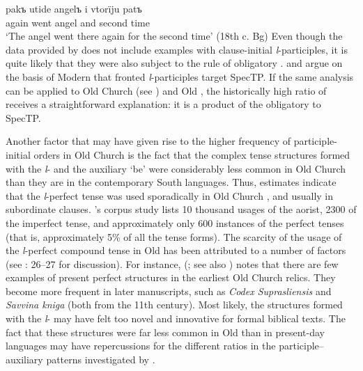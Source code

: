 \documentclass[output=paper,modfonts,newtxmath,hidelinks]{langscibook}
\begin{document}
\ea \label{11:ex20}
	\gll pakъ utide angelъ i vtorïju patъ\\
     again went angel and second time\\
	\glt `The angel went there again for the second time' \hfill (18th c. Bg)
\z
Even though the  data provided by \citet[153--154]{pancheva2005} does not include examples with clause-initial \textit{l}{}-participles, it is quite likely that they were also subject to the rule of obligatory . \citet{broekhuis-migdalski2003} and \citet{migdalski2006} argue on the basis of Modern  that fronted \textit{l}{}-participles target SpecTP. If the same analysis can be applied to Old Church  (see \citealt{willis2000}) and Old , the historically high ratio of  receives a straightforward explanation: it is a product of the obligatory  to SpecTP.

Another factor that may have given rise to the higher frequency of participle-initial orders in Old Church  is the fact that the complex tense structures formed with the \textit{l}{}- and the auxiliary `be' were considerably less common in Old Church  than they are in the contemporary South  languages. Thus,  estimates indicate that the \textit{l}{}-perfect tense was used sporadically in Old Church , and usually in subordinate clauses. \citeauthor{dostal1954}’s corpus study lists 10 thousand usages of the aorist, 2300 of the imperfect tense, and approximately only 600 instances of the perfect tenses (that is, approximately 5\% of all the tense forms). The scarcity of the usage of the \textit{l}{}-perfect compound tense in Old  has been attributed to a number of factors (see \citealt{migdalski2006}: 26--27 for discussion). For instance, \citeauthor{bartula1981} (\citeyear[100]{bartula1981}; see also \citealt{damborsky1967}) notes that there are few examples of present perfect structures in the earliest Old Church  relics. They become more frequent in later manuscripts, such as \textit{Codex Suprasliensis} and \textit{Savvina kniga} (both from the 11th century). Most likely, the structures formed with the \textit{l}{}- may have felt too novel and innovative for formal biblical texts. The fact that these structures were far less common in Old  than in present-day  languages may have repercussions for the different ratios in the participle--auxiliary patterns investigated by \citet{pancheva2008}.
\end{document}
